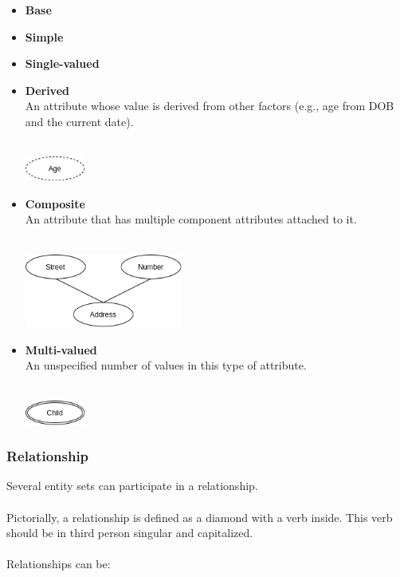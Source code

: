 \documentclass{article}
\begin{document}
\begin{itemize}
	\item \textbf{Base}
	
	\item \textbf{Simple}
	
	\item \textbf{Single-valued}
	
	\item \textbf{Derived}
	\vspace{.2cm} \\
	An attribute whose value is derived from other factors (e.g., age from DOB and the current date). \\ \\
	
	\centerline{\includegraphics[width=2cm]{./assets/derived.png}}
	
	\item \textbf{Composite}
	\vspace{.2cm} \\
	An attribute that has multiple component attributes attached to it. \\ \\
	
	\centerline{\includegraphics[width=5.2cm]{./assets/composite.png}}
	
	\item \textbf{Multi-valued}
	\vspace{.2cm} \\
	An unspecified number of values in this type of attribute. \\ \\
	
	\centerline{\includegraphics[width=2cm]{./assets/multivalued.png}}
\end{itemize}
	
\subsubsection{Relationship}
Several entity sets can participate in a relationship.\\ \\
Pictorially, a relationship is defined as a diamond with a verb inside. This verb should be in third person singular and capitalized. \\ \\
Relationships can be:
\end{document}
